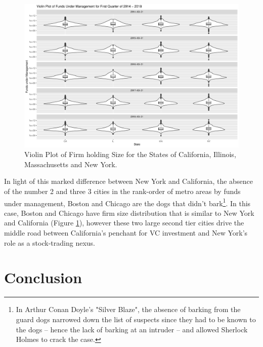 \begin{figure}
    \centering
	\includegraphics[width=1\linewidth]{Figures/ChapterV/Violinplot_q1}
	\caption[Violin Plot of Firm Holding Size for CA, IL, MA and NY.]{Violin Plot of Firm holding Size for the States of California, Illinois, Massachusetts and New York.}
	\label{fig:violinplotq1}
\end{figure}


In light of this marked difference between New York and California, the absence of the number 2 and three 3 cities in the rank-order of metro areas by funds under management, Boston and Chicago are the dogs that didn't bark\footnote{In Arthur Conan Doyle's "Silver Blaze", the absence of barking from the guard dogs narrowed down the list of suspects since they had to be known to the dogs -- hence the lack of barking at an intruder -- and allowed Sherlock Holmes to crack the case.}.  In this case, Boston and Chicago have firm size distribution that is similar to New York and California (Figure \ref{fig:violinplotq1}), however these two large second tier cities drive the middle road between California's penchant for VC investment and New York's role as a stock-trading  nexus.

\section{Conclusion}

